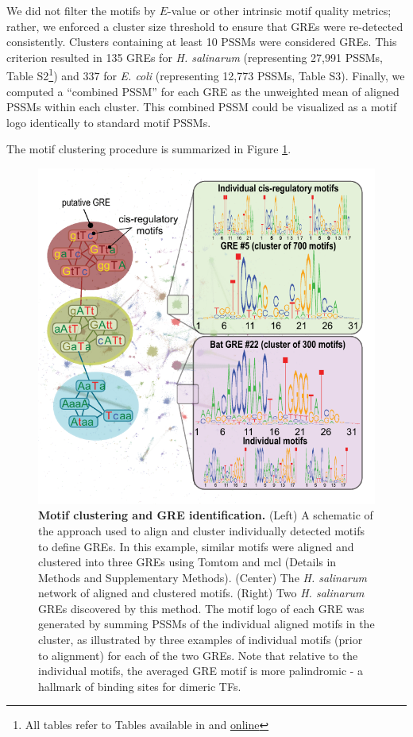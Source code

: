 We did not filter the motifs by $E$-value or other intrinsic motif quality metrics; rather, we enforced a cluster size threshold to ensure that GREs were re-detected consistently. Clusters containing at least 10 PSSMs were considered GREs. This criterion resulted in 135 GREs for {\it H. salinarum} (representing 27,991 PSSMs, Table S2\footnote{All tables refer to Tables available in \cite{brooks_systemlevel_2014} and \href{http://egrin2.systemsbiology.net}{online}}) and 337 for {\it E. coli} (representing 12,773 PSSMs, Table S3). Finally, we computed a ``combined PSSM'' for each GRE as the unweighted mean of aligned PSSMs within each cluster. This combined PSSM could be visualized as a motif logo identically to standard motif PSSMs.

The motif clustering procedure is summarized in Figure \ref{fig:gre_clustering}. 

\begin{figure}[h!]
\centering
\includegraphics[width=0.6\linewidth]{figures/gre_clustering.pdf}
\caption[Motif clustering and GRE identification]{
\textbf{Motif clustering and GRE identification.} (Left) A schematic of the approach used to align and cluster individually detected motifs to define GREs. In this example, similar motifs were aligned and clustered into three GREs using Tomtom and mcl (Details in Methods and Supplementary Methods). (Center) The {\it H. salinarum} network of aligned and clustered motifs. (Right) Two {\it H. salinarum} GREs discovered by this method. The motif logo of each GRE was generated by summing PSSMs of the individual aligned motifs in the cluster, as illustrated by three examples of individual motifs (prior to alignment) for each of the two GREs. Note that relative to the individual motifs, the averaged GRE motif is more palindromic - a hallmark of binding sites for dimeric TFs.}
\label{fig:gre_clustering}
\end{figure}

